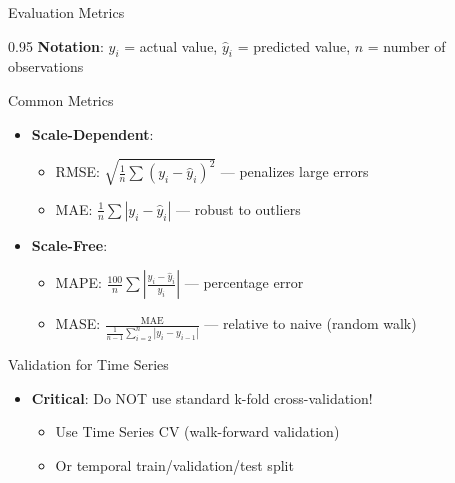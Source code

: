\documentclass[9pt, aspectratio=169, t]{beamer}
\begin{document}
\begin{frame}{Evaluation Metrics}
    \begin{cminipage}{0.95\textwidth}
    \vspace{-0.2cm}
    {\small \textbf{Notation}: $y_i$ = actual value, $\hat{y}_i$ = predicted value, $n$ = number of observations}
    \vspace{0.1cm}
    \begin{block}{Common Metrics}
        \begin{itemize}\setlength{\itemsep}{0pt}
            \item \textbf{Scale-Dependent}:
            \begin{itemize}\setlength{\itemsep}{0pt}
                \item RMSE: $\sqrt{\frac{1}{n}\sum(y_i - \hat{y}_i)^2}$ --- penalizes large errors
                \item MAE: $\frac{1}{n}\sum|y_i - \hat{y}_i|$ --- robust to outliers
            \end{itemize}
            \item \textbf{Scale-Free}:
            \begin{itemize}\setlength{\itemsep}{0pt}
                \item MAPE: $\frac{100}{n}\sum\left|\frac{y_i - \hat{y}_i}{y_i}\right|$ --- percentage error
                \item MASE: $\frac{\text{MAE}}{\frac{1}{n-1}\sum_{i=2}^{n}|y_i - y_{i-1}|}$ --- relative to naive (random walk)
            \end{itemize}
        \end{itemize}
    \end{block}

    \begin{alertblock}{Validation for Time Series}
        \begin{itemize}\setlength{\itemsep}{0pt}
            \item \textbf{Critical}: Do NOT use standard k-fold cross-validation!
            \begin{itemize}\setlength{\itemsep}{0pt}
                \item Use Time Series CV (walk-forward validation)
                \item Or temporal train/validation/test split
            \end{itemize}
        \end{itemize}
    \end{alertblock}
    \end{cminipage}
\end{frame}
\end{document}
